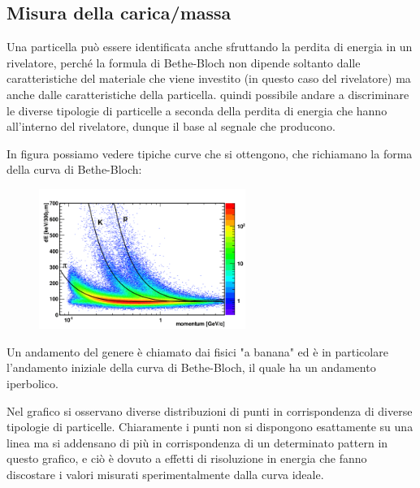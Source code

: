 \subsection{Misura della carica/massa}

Una particella può essere identificata anche sfruttando la perdita di energia in un rivelatore, perché la formula di Bethe-Bloch non dipende soltanto dalle caratteristiche del materiale che viene investito (in questo caso del rivelatore) ma anche dalle caratteristiche della particella. \E quindi possibile andare a discriminare le diverse tipologie di particelle a seconda della perdita di energia che hanno all'interno del rivelatore, dunque il base al segnale che producono.

In figura possiamo vedere tipiche curve che si ottengono, che richiamano la forma della curva di Bethe-Bloch:

\begin{figure}[H]
   \centering
   \includegraphics[width=0.6\textwidth]{immagini/grafici_perdita_energia.png}
\end{figure}

Un andamento del genere è chiamato dai fisici "a banana" ed è in particolare l'andamento iniziale della curva di Bethe-Bloch, il quale ha un andamento iperbolico.

Nel grafico si osservano diverse distribuzioni di punti in corrispondenza di diverse tipologie di particelle. Chiaramente i punti non si dispongono esattamente su una linea ma si addensano di più in corrispondenza di un determinato pattern in questo grafico, e ciò è dovuto a effetti di risoluzione in energia che fanno discostare i valori misurati sperimentalmente dalla curva ideale.